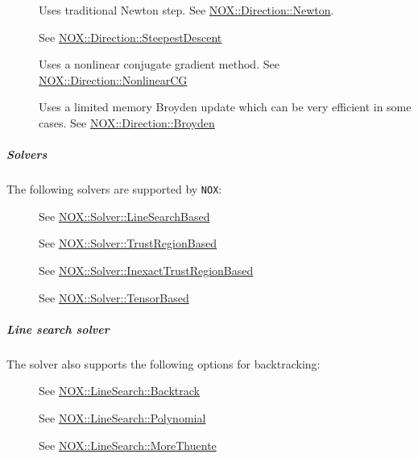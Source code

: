 \begin{description}
\item[] Uses traditional Newton step. See \href{https://docs.trilinos.org/latest-release/packages/nox/doc/html/classNOX_1_1Direction_1_1Newton.html}{NOX::Direction::Newton}.
\item[] See \href{https://docs.trilinos.org/latest-release/packages/nox/doc/html/classNOX_1_1Direction_1_1SteepestDescent.html}{NOX::Direction::SteepestDescent}
\item[] Uses a nonlinear conjugate gradient method. See \href{https://docs.trilinos.org/latest-release/packages/nox/doc/html/classNOX_1_1Direction_1_1NonlinearCG.html}{NOX::Direction::NonlinearCG}
\item[] Uses a limited memory Broyden update which can be very efficient in some cases. See \href{https://docs.trilinos.org/latest-release/packages/nox/doc/html/classNOX_1_1Direction_1_1Broyden.html}{NOX::Direction::Broyden}
\end{description}
\subparagraph{Solvers}
The following solvers are supported by \verb;NOX;:
\begin{description}
\item[] See \href{https://docs.trilinos.org/latest-release/packages/nox/doc/html/classNOX_1_1Solver_1_1LineSearchBased.html}{NOX::Solver::LineSearchBased}
\item[] See \href{https://docs.trilinos.org/latest-release/packages/nox/doc/html/classNOX_1_1Solver_1_1TrustRegionBased.html}{NOX::Solver::TrustRegionBased}
\item[] See \href{https://docs.trilinos.org/latest-release/packages/nox/doc/html/classNOX_1_1Solver_1_1InexactTrustRegionBased.html}{NOX::Solver::InexactTrustRegionBased}
\item[] See \href{https://docs.trilinos.org/latest-release/packages/nox/doc/html/classNOX_1_1Solver_1_1TensorBased.html}{NOX::Solver::TensorBased}
\end{description}
\subparagraph{Line search solver}
The  solver also supports the following options for backtracking:
\begin{description}
\item[] See \href{https://docs.trilinos.org/latest-release/packages/nox/doc/html/classNOX_1_1LineSearch_1_1Backtrack.html}{NOX::LineSearch::Backtrack}
\item[] See \href{https://docs.trilinos.org/latest-release/packages/nox/doc/html/classNOX_1_1LineSearch_1_1Polynomial.html}{NOX::LineSearch::Polynomial}
\item[] See \href{https://docs.trilinos.org/latest-release/packages/nox/doc/html/classNOX_1_1LineSearch_1_1MoreThuente.html}{NOX::LineSearch::MoreThuente}
\end{description}
